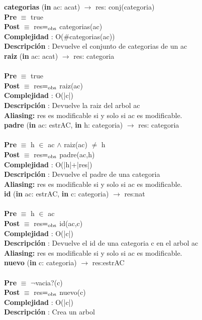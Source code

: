 	\textbf{categorias} (\textbf{in} ac: acat) $\longrightarrow$ res: conj(categoria)\\
	\textbf{Pre} $\equiv$ {true}\\
	\textbf{Post} $\equiv$ {res$=_{\mathrm{obs}}$ categorias(ac)}\\
	\textbf{Complejidad} : O($\#$categorias(ac))\\
	\textbf{Descripci\'{o}n} : Devuelve el conjunto de categorias de un ac\\
	
	\textbf{raiz} (\textbf{in} ac: acat) $\longrightarrow$ res: categoria\\\\
	\textbf{Pre} $\equiv$ {true}\\
	\textbf{Post} $\equiv$ {res$=_{\mathrm{obs}}$ raiz(ac)}\\
	\textbf{Complejidad} : O(|c|)\\
	\textbf{Descripci\'{o}n} : Devuelve la raiz del arbol ac\\
	\textbf{Aliasing: }{res es modificable si y solo si ac es modificable.}\\
	
	\textbf{padre} (\textbf{in} ac: estrAC, \textbf{in} h: categoria) $\longrightarrow$ res: categoria\\\\
	\textbf{Pre} $\equiv$ {h $\in$ ac $\wedge$ raiz(ac) $\neq$ h}\\
	\textbf{Post} $\equiv$ {res$=_{\mathrm{obs}}$ padre(ac,h)}\\
	\textbf{Complejidad} : O(|h|+|res|)\\
	\textbf{Descripci\'{o}n} : Devuelve el padre de una categoria\\
	\textbf{Aliasing: }{res es modificable si y solo si ac es modificable.}\\
		
	\textbf{id} (\textbf{in} ac: estrAC, \textbf{in} c: categoria) $\longrightarrow$ res:nat\\\\
	\textbf{Pre} $\equiv$ {h $\in$ ac}\\
	\textbf{Post} $\equiv$ {res$=_{\mathrm{obs}}$ id(ac,c)}\\
	\textbf{Complejidad} : O(|c|)\\
	\textbf{Descripci\'{o}n} : Devuelve el id de una categoria c en el arbol ac\\
	\textbf{Aliasing: }{res es modificable si y solo si ac es modificable.}\\
	
	\textbf{nuevo} (\textbf{in} c: categoria) $\longrightarrow$ res:estrAC\\\\
	\textbf{Pre} $\equiv$ {$¬$vacia?(c)}\\
	\textbf{Post} $\equiv$ {res$=_{\mathrm{obs}}$ nuevo(c)}\\
	\textbf{Complejidad} : O(|c|)\\
	\textbf{Descripci\'{o}n} : Crea un arbol\\
	

